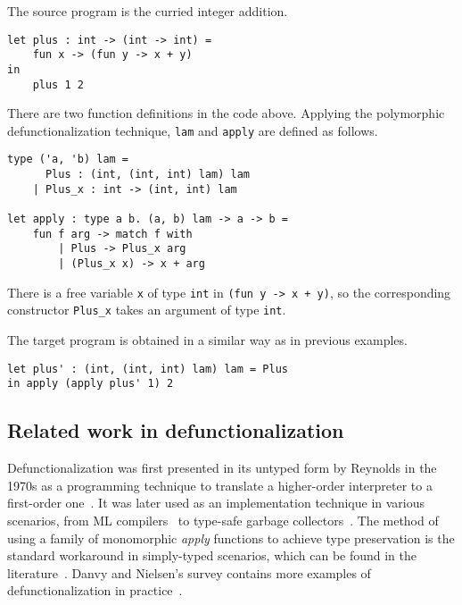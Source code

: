 \begin{exmp}
\label{ex: full dfc}
The source program is the curried integer addition.
\begin{lstlisting}
let plus : int -> (int -> int) = 
    fun x -> (fun y -> x + y)
in
    plus 1 2
\end{lstlisting}
There are two function definitions in the code above. Applying the polymorphic defunctionalization technique, \texttt{lam} and \texttt{apply} are defined as follows.
\begin{lstlisting}
type ('a, 'b) lam = 
      Plus : (int, (int, int) lam) lam
    | Plus_x : int -> (int, int) lam

let apply : type a b. (a, b) lam -> a -> b =
    fun f arg -> match f with
        | Plus -> Plus_x arg
        | (Plus_x x) -> x + arg
\end{lstlisting}
There is a free variable \texttt{x} of type \texttt{int} in \texttt{(fun y -> x + y)}, so the corresponding constructor \texttt{Plus\_x} takes an argument of type \texttt{int}.

The target program is obtained in a similar way as in previous examples.
\begin{lstlisting}
let plus' : (int, (int, int) lam) lam = Plus
in apply (apply plus' 1) 2
\end{lstlisting}

\end{exmp}

\subsection{Related work in defunctionalization}

Defunctionalization was first presented in its untyped form by Reynolds in the 1970s as a programming technique to translate a higher-order interpreter to a first-order one~\cite{DBLP:conf/acm/Reynolds72}. It was later used as an implementation technique in various scenarios, from ML compilers~\cite{DBLP:journals/lisp/ChinD96,DBLP:conf/esop/CejtinJW00} to type-safe garbage collectors~\cite{DBLP:conf/popl/WangA01}. The method of using a family of monomorphic \textit{apply} functions to achieve type preservation is the standard workaround in simply-typed scenarios, which can be found in the literature~\cite{DBLP:conf/icfp/BellBH97,DBLP:journals/jfp/TolmachO98,DBLP:conf/esop/CejtinJW00,nielsen2000denotational}. Danvy and Nielsen’s survey contains more examples of defunctionalization in practice~\cite{danvy2001defunctionalization}.

